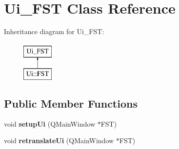 \hypertarget{classUi__FST}{\section{Ui\-\_\-\-F\-S\-T Class Reference}
\label{classUi__FST}
}
Inheritance diagram for Ui\-\_\-\-F\-S\-T\-:\begin{figure}[H]
\begin{center}
\leavevmode
\includegraphics[height=2.000000cm]{classUi__FST}
\end{center}
\end{figure}
\subsection*{Public Member Functions}
\begin{DoxyCompactItemize}
\item 
\hypertarget{classUi__FST_aee3b34b89ac4cdfb76a600aa40b29f72}{void {\bfseries setup\-Ui} (Q\-Main\-Window $\ast$F\-S\-T)}\label{classUi__FST_aee3b34b89ac4cdfb76a600aa40b29f72}

\item 
\hypertarget{classUi__FST_aefacf5818516bcd241a1c419496679fa}{void {\bfseries retranslate\-Ui} (Q\-Main\-Window $\ast$F\-S\-T)}\label{classUi__FST_aefacf5818516bcd241a1c419496679fa}

\end{DoxyCompactItemize}
